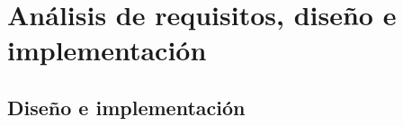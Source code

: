 \chapter{An\'alisis de requisitos, dise\~no e implementaci\'on}\label{requisitos}




\section{Dise\~no e implementaci\'on}
